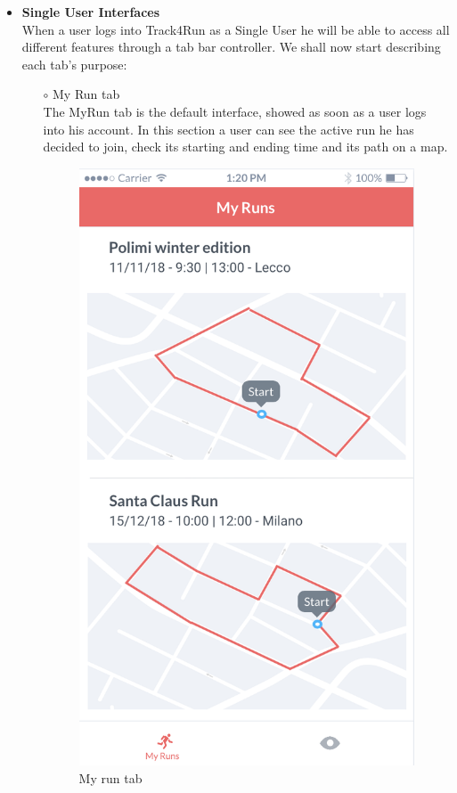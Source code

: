 \documentclass[titlepage]{article}
\begin{document}
\begin{itemize}
\begin{itemize}
				\item{\bf Single User Interfaces}\\
			When a user logs into Track4Run as a Single User he will be able to access all different features through a tab bar controller. We shall now start describing each tab’s purpose:
				\begin{itemize}
					\item[$\circ$] My Run tab \\
					The MyRun tab is the default interface, showed as soon as a user logs into his account. In this section a user can see the active run he has decided to join, check its starting and ending time and its path on a map.\\
					\begin{figure}[H]
						\center
  						\includegraphics[width=0.5\columnwidth]{Mockup/mockupMyRunSU.png}
  						\caption{My run tab}
 					 	\label{fig:MyRun}
					\end{figure}


\end{itemize}
\end{itemize}
\end{itemize}
\end{document}
